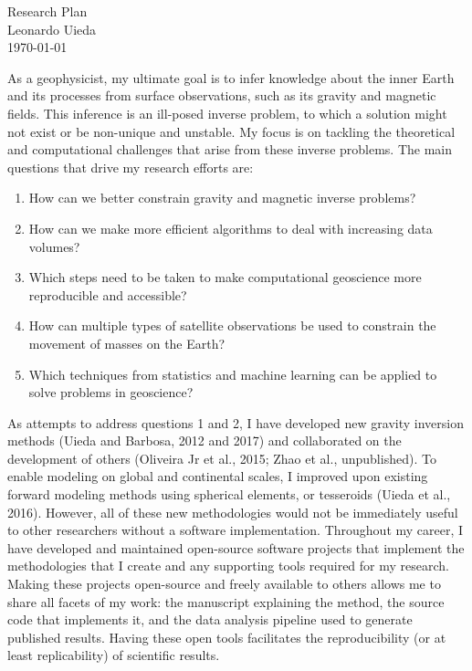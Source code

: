\documentclass[12pt,notitlepage]{article}
\begin{document}
\begin{center}
    {\huge Research Plan}
    \\[0.2in]
    {Leonardo Uieda}
    \\[0.1in]
    {\small \today}
\end{center}


As a geophysicist, my ultimate goal is to infer knowledge about the inner Earth and its
processes from surface observations, such as its gravity and magnetic fields.
This inference is an ill-posed inverse problem, to which a solution might not exist or
be non-unique and unstable.
My focus is on tackling the theoretical and computational challenges that arise from
these inverse problems.
The main questions that drive my research efforts are:

\begin{enumerate}
    \item How can we better constrain gravity and magnetic inverse problems?
    \item How can we make more efficient algorithms to deal with increasing data volumes?
    \item Which steps need to be taken to make computational geoscience more reproducible
        and accessible?
    \item How can multiple types of satellite observations be used to constrain the
        movement of masses on the Earth?
    \item Which techniques from statistics and machine learning can be applied to solve
        problems in geoscience?
\end{enumerate}

As attempts to address questions 1 and 2, I have developed new gravity inversion methods
(Uieda and Barbosa, 2012 and 2017) and collaborated on the development of others
(Oliveira Jr et al., 2015; Zhao et al., unpublished).
To enable modeling on global and continental scales, I improved upon existing forward
modeling methods using spherical elements, or tesseroids (Uieda et al., 2016).
However, all of these new methodologies would not be immediately useful to other
researchers without a software implementation.
Throughout my career, I have developed and maintained open-source software projects that
implement the methodologies that I create and any supporting tools required for my
research.
Making these projects open-source and freely available to others allows me to share all
facets of my work: the manuscript explaining the method, the source code that implements
it, and the data analysis pipeline used to generate published results.
Having these open tools facilitates the reproducibility (or at least replicability) of
scientific results.
\end{document}
